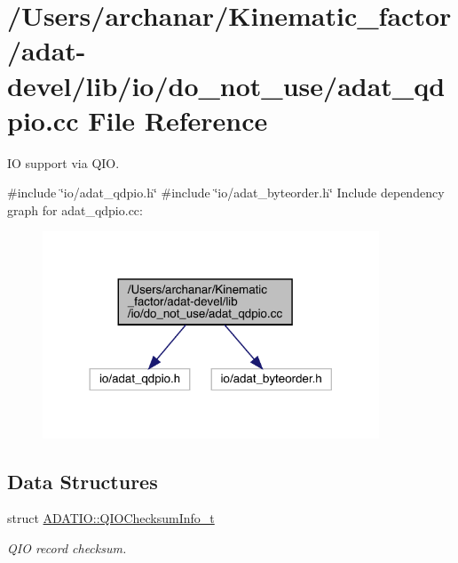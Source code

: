 \hypertarget{adat-devel_2lib_2io_2do__not__use_2adat__qdpio_8cc}{}\section{/\+Users/archanar/\+Kinematic\+\_\+factor/adat-\/devel/lib/io/do\+\_\+not\+\_\+use/adat\+\_\+qdpio.cc File Reference}
\label{adat-devel_2lib_2io_2do__not__use_2adat__qdpio_8cc}


IO support via Q\+IO.  


{\ttfamily \#include \char`\"{}io/adat\+\_\+qdpio.\+h\char`\"{}}\newline
{\ttfamily \#include \char`\"{}io/adat\+\_\+byteorder.\+h\char`\"{}}\newline
Include dependency graph for adat\+\_\+qdpio.\+cc\+:
\nopagebreak
\begin{figure}[H]
\begin{center}
\leavevmode
\includegraphics[width=284pt]{d4/dcd/adat-devel_2lib_2io_2do__not__use_2adat__qdpio_8cc__incl}
\end{center}
\end{figure}
\subsection*{Data Structures}
\begin{DoxyCompactItemize}
\item 
struct \mbox{\hyperlink{structADATIO_1_1QIOChecksumInfo__t}{A\+D\+A\+T\+I\+O\+::\+Q\+I\+O\+Checksum\+Info\+\_\+t}}
\begin{DoxyCompactList}\small\item\em Q\+IO record checksum. \end{DoxyCompactList}\end{DoxyCompactItemize}
